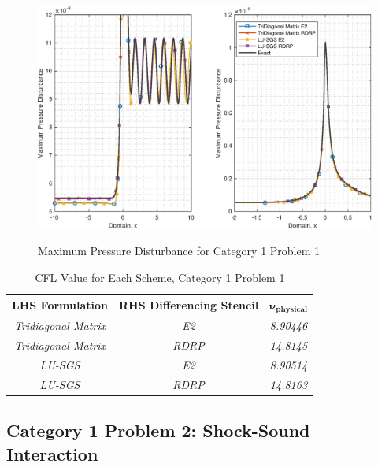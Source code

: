 \documentclass[conf]{new-aiaa}
\begin{document}
\begin{figure}[hbtp!]
	\centering
	{\includegraphics[width=1.0\textwidth]{Figures/Max_Dis_Closeup_Both}}
	\caption{Maximum Pressure Disturbance for Category 1 Problem 1}
	\label{fig:Unsteady_C1P1}
\end{figure}


\begin{table}[htp!]
\centering
\caption{CFL Value for Each Scheme, Category 1 Problem 1}
\label{tab:C1P1}
\begin{tabular}{|c|c|c|}
\hline
\textbf{LHS Formulation} & \textbf{RHS Differencing Stencil} & \textbf{$\boldsymbol{\nu_{physical}}$} \\ \hline
\textit{Tridiagonal Matrix} & \textit{E2}   & \textit{8.90446} \\ \hline
\textit{Tridiagonal Matrix} & \textit{RDRP} & \textit{14.8145} \\ \hline
\textit{LU-SGS}             & \textit{E2}   & \textit{8.90514} \\ \hline
\textit{LU-SGS}             & \textit{RDRP} & \textit{14.8163} \\ \hline
\end{tabular}
\end{table}

\subsection{Category 1 Problem 2: Shock-Sound Interaction}
\end{document}
